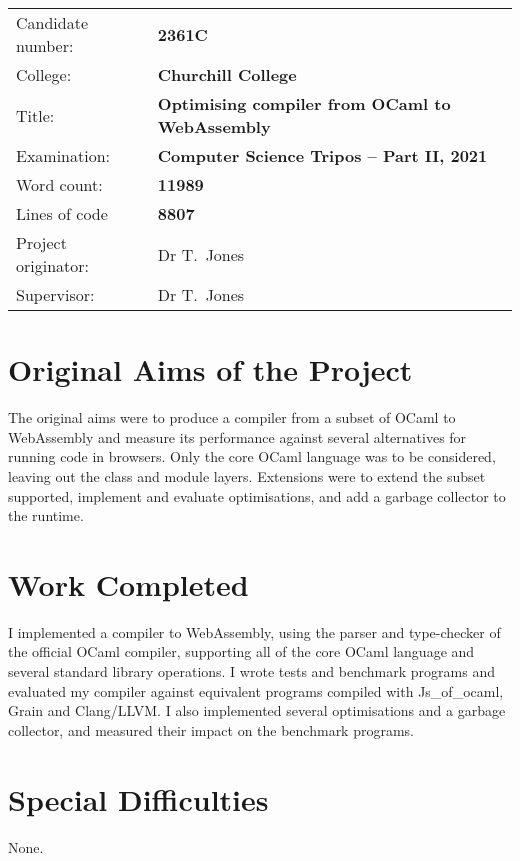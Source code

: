 \documentclass[a4paper,12pt,twoside]{report} %
\def\authorcollege{Churchill College\xspace}
\def\dissertationtitle{Optimising compiler from OCaml to WebAssembly}
\def\wordcount{11989} %
\begin{document}
{\large
\begin{tabular}{ll}
Candidate number:               & \bf {2361C}     \\
College:            & \bf\authorcollege     \\
Title:      & \bf\dissertationtitle \\
Examination:        & \bf Computer Science Tripos -- Part II, 2021  \\
Word count:         & \bf \wordcount \footnotemark[1] \\
Lines of code 	 & \bf {8807}\footnotemark[2] \\
Project originator: & Dr T.~Jones                    \\
Supervisor:         &  Dr T.~Jones                   \\ 
\end{tabular}
}

\section*{Original Aims of the Project}

The original aims were to produce a compiler from a subset of OCaml to WebAssembly and measure its performance against several alternatives for running code in browsers. Only the core OCaml language was to be considered, leaving out the class and module layers. Extensions were to extend the subset supported,  implement and evaluate optimisations, and add a garbage collector to the runtime.


\section*{Work Completed} %
I implemented a compiler to WebAssembly, using the parser and type-checker of the official OCaml compiler, supporting all of the core OCaml language and several standard library operations. I wrote tests and benchmark programs and evaluated my compiler against equivalent programs compiled with Js\_of\_ocaml, Grain and Clang/LLVM. I also implemented several optimisations and a garbage collector, and measured their impact on the benchmark programs.

\section*{Special Difficulties}
None.
 
\end{document}
